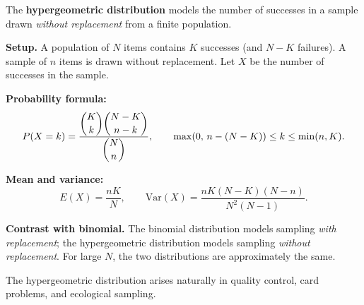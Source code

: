 
The \textbf{hypergeometric distribution} models the number of successes in a sample drawn \emph{without replacement} from a finite population.

\textbf{Setup.} A population of $N$ items contains $K$ successes (and $N-K$ failures). A sample of $n$ items is drawn without replacement. Let $X$ be the number of successes in the sample.

\textbf{Probability formula:}
\[
P(X = k) = \frac{\dbinom{K}{k}\dbinom{N-K}{n-k}}{\dbinom{N}{n}}, \qquad \max(0,\,n-(N-K)) \leq k \leq \min(n,K).
\]

\textbf{Mean and variance:}
\[
E(X) = \frac{nK}{N}, \qquad \mathrm{Var}(X) = \frac{nK(N-K)(N-n)}{N^2(N-1)}.
\]

\textbf{Contrast with binomial.} The binomial distribution models sampling \emph{with replacement}; the hypergeometric distribution models sampling \emph{without replacement}. For large $N$, the two distributions are approximately the same.



\begin{remark}
The hypergeometric distribution arises naturally in quality control, card problems, and ecological sampling.
\end{remark}
